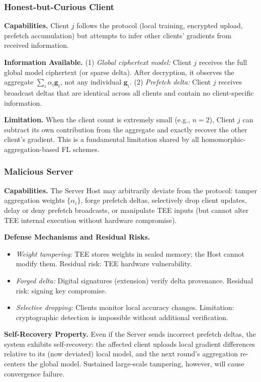 \subsubsection{Honest-but-Curious Client}

\textbf{Capabilities.} Client $j$ follows the protocol (local training, encrypted upload, prefetch accumulation) but attempts to infer other clients' gradients from received information.

\textbf{Information Available.}
(1) \textit{Global ciphertext model:} Client $j$ receives the full global model ciphertext (or sparse delta). After decryption, it observes the aggregate $\sum_i \alpha_i \mathbf{g}_i$, not any individual $\mathbf{g}_i$. (2) \textit{Prefetch delta:} Client $j$ receives broadcast deltas that are identical across all clients and contain no client-specific information.

\textbf{Limitation.} When the client count is extremely small (e.g., $n=2$), Client $j$ can subtract its own contribution from the aggregate and exactly recover the other client's gradient. This is a fundamental limitation shared by all homomorphic-aggregation-based FL schemes.

\subsubsection{Malicious Server}

\textbf{Capabilities.} The Server Host may arbitrarily deviate from the protocol: tamper aggregation weights $\{\alpha_i\}$, forge prefetch deltas, selectively drop client updates, delay or deny prefetch broadcasts, or manipulate TEE inputs (but cannot alter TEE internal execution without hardware compromise).

\textbf{Defense Mechanisms and Residual Risks.}
\begin{itemize}
    \item \textit{Weight tampering:} TEE stores weights in sealed memory; the Host cannot modify them. Residual risk: TEE hardware vulnerability.
    \item \textit{Forged delta:} Digital signatures (extension) verify delta provenance. Residual risk: signing key compromise.
    \item \textit{Selective dropping:} Clients monitor local accuracy changes. Limitation: cryptographic detection is impossible without additional verification.
\end{itemize}

\textbf{Self-Recovery Property.} Even if the Server sends incorrect prefetch deltas, the system exhibits self-recovery: the affected client uploads local gradient differences relative to its (now deviated) local model, and the next round's aggregation re-centers the global model. Sustained large-scale tampering, however, will cause convergence failure.

